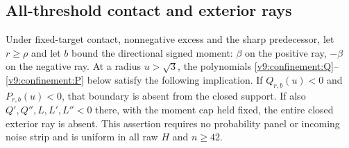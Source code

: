 \subsection{All-threshold contact and exterior rays}
\begin{lemma}\label{v9:confinement:heat}
Under fixed-target contact, nonnegative excess and the sharp predecessor,
let $r\ge\rho$ and let $b$ bound the directional signed moment: $\beta$
on the positive ray, $-\beta$ on the negative ray. At a radius $u>\sqrt3$,
the polynomials \eqref{v9:confinement:Q}--\eqref{v9:confinement:P} below
satisfy the following implication. If $Q_{r,b}(u)<0$ and
$P_{r,b}(u)<0$, that boundary is absent from the closed support. If also
$Q',Q'',L,L',L''<0$ there, with the moment cap held fixed, the entire
closed exterior ray is absent. This assertion requires no probability
panel or incoming noise strip and is uniform in all raw $H$ and $n\ge42$.
\end{lemma}
